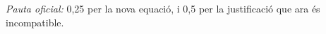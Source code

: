 \begin{apartats}
\begin{solucio}
\textit{Pauta oficial:} 0,25 per la nova equació, i 0,5 per la justificació que ara és incompatible.
\end{solucio}

\end{apartats}
